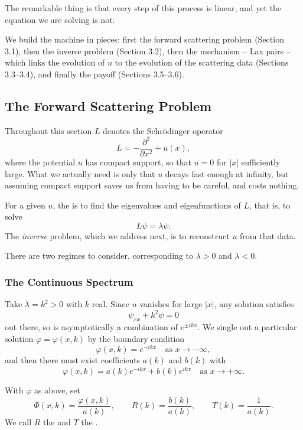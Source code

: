 The remarkable thing is that every step of this process is linear, and yet the equation we are solving is not.

We build the machine in pieces: first the forward scattering problem (Section 3.1), then the inverse problem (Section 3.2), then the mechanism -- Lax pairs -- which links the evolution of $u$ to the evolution of the scattering data (Sections 3.3--3.4), and finally the payoff (Sections 3.5--3.6).

\subsection{The Forward Scattering Problem}

Throughout this section $L$ denotes the Schr\"odinger operator
$$
L = -\frac{\partial^2}{\partial x^2} + u(x),
$$
where the potential $u$ has compact support, so that $u = 0$ for $|x|$ sufficiently large. What we actually need is only that $u$ decays fast enough at infinity, but assuming compact support saves us from having to be careful, and costs nothing.

For a given $u$, the  is to find the eigenvalues and eigenfunctions of $L$, that is, to solve
$$
L\psi = \lambda\psi.
$$
The \emph{inverse} problem, which we address next, is to reconstruct $u$ from that data.

There are two regimes to consider, corresponding to $\lambda > 0$ and $\lambda < 0$.

\subsubsection{The Continuous Spectrum}

Take $\lambda = k^2 > 0$ with $k$ real. Since $u$ vanishes for large $|x|$, any solution satisfies
$$
\psi_{xx} + k^2\psi = 0
$$
out there, so is asymptotically a combination of $e^{\pm ikx}$. We single out a particular solution $\varphi = \varphi(x,k)$ by the boundary condition
$$
\varphi(x,k) = e^{-ikx}\quad\text{as } x\to-\infty,
$$
and then there must exist coefficients $a(k)$ and $b(k)$ with
$$
\varphi(x,k) = a(k)e^{-ikx} + b(k)e^{ikx}\quad\text{as } x\to+\infty.
$$

\begin{definition}
	With $\varphi$ as above, set
	$$
	\Phi(x,k) = \frac{\varphi(x,k)}{a(k)}, \qquad R(k) = \frac{b(k)}{a(k)}, \qquad T(k) = \frac{1}{a(k)}.
	$$
	We call $R$ the  and $T$ the .
\end{definition}

